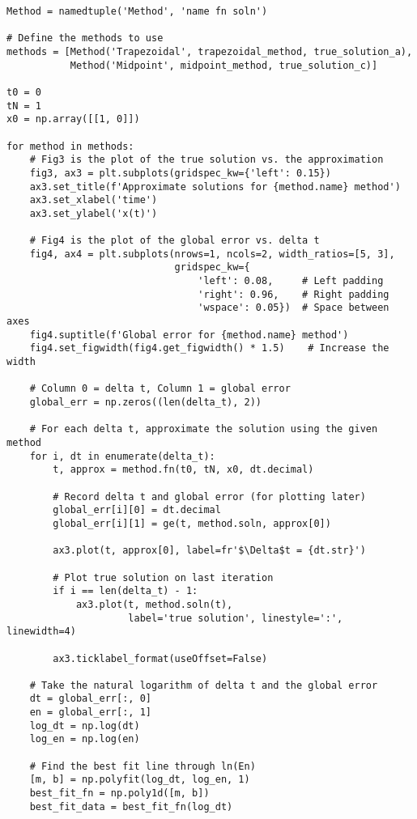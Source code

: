 \documentclass{article}
\begin{document}
\begin{verbatim}
Method = namedtuple('Method', 'name fn soln')

# Define the methods to use
methods = [Method('Trapezoidal', trapezoidal_method, true_solution_a),
           Method('Midpoint', midpoint_method, true_solution_c)]

t0 = 0
tN = 1
x0 = np.array([[1, 0]])

for method in methods:
    # Fig3 is the plot of the true solution vs. the approximation
    fig3, ax3 = plt.subplots(gridspec_kw={'left': 0.15})
    ax3.set_title(f'Approximate solutions for {method.name} method')
    ax3.set_xlabel('time')
    ax3.set_ylabel('x(t)')

    # Fig4 is the plot of the global error vs. delta t
    fig4, ax4 = plt.subplots(nrows=1, ncols=2, width_ratios=[5, 3],
                             gridspec_kw={
                                 'left': 0.08,     # Left padding
                                 'right': 0.96,    # Right padding
                                 'wspace': 0.05})  # Space between axes
    fig4.suptitle(f'Global error for {method.name} method')
    fig4.set_figwidth(fig4.get_figwidth() * 1.5)    # Increase the width

    # Column 0 = delta t, Column 1 = global error
    global_err = np.zeros((len(delta_t), 2))

    # For each delta t, approximate the solution using the given method
    for i, dt in enumerate(delta_t):
        t, approx = method.fn(t0, tN, x0, dt.decimal)

        # Record delta t and global error (for plotting later)
        global_err[i][0] = dt.decimal
        global_err[i][1] = ge(t, method.soln, approx[0])

        ax3.plot(t, approx[0], label=fr'$\Delta$t = {dt.str}')

        # Plot true solution on last iteration
        if i == len(delta_t) - 1:
            ax3.plot(t, method.soln(t),
                     label='true solution', linestyle=':', linewidth=4)

        ax3.ticklabel_format(useOffset=False)

    # Take the natural logarithm of delta t and the global error
    dt = global_err[:, 0]
    en = global_err[:, 1]
    log_dt = np.log(dt)
    log_en = np.log(en)

    # Find the best fit line through ln(En)
    [m, b] = np.polyfit(log_dt, log_en, 1)
    best_fit_fn = np.poly1d([m, b])
    best_fit_data = best_fit_fn(log_dt)


\end{verbatim}
\end{document}
